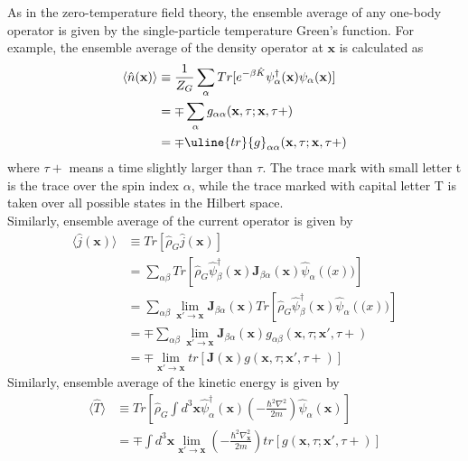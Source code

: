 As in the zero-temperature field theory, the ensemble average of any one-body operator is given by the single-particle temperature Green's function.
For example, the ensemble average of the density operator at $\mathbf{x}$ is calculated as
\begin{equation}\label{eq4.1.7}
\begin{aligned}
\langle\hat{n}(\mathbf{x})\rangle&\equiv\frac{1}{Z_{G}}\sum_{\alpha}Tr[e^{-\beta\hat{K}}\psi_{\alpha}^{\dagger}(\mathbf{x})\psi_{\alpha}(\mathbf{x})]\\
&=\mp\sum_{\alpha}g_{\alpha\alpha}(\mathbf{x},\tau;\mathbf{x},\tau+)\\
&=\mp\uline{tr}{g}_{\alpha\alpha}(\mathbf{x},\tau;\mathbf{x},\tau+)
\end{aligned}
\end{equation}
where $\tau+$ means a time slightly larger than $\tau$. The trace mark with small letter t is the trace over the spin index $\alpha$, while the trace marked with capital letter T is taken over all possible states in the Hilbert space.\\
Similarly, ensemble average of the current operator is given by
\begin{equation}
\begin{aligned}
\langle\hat{j}(\mathbf{x})\rangle& \equiv Tr[\hat{\rho}_{G}\hat{j}(\mathbf{x})]\\
&=\sum_{\alpha\beta}Tr[\hat{\rho}_{G}\hat{\psi}_{\beta}^{\dagger}(\mathbf{x})\mathbf{J}_{\beta\alpha}(\mathbf{x})\hat{\psi}_{\alpha}(\mathbf(x))]\\
&=\sum_{\alpha\beta}\lim_{\mathbf{x'}\rightarrow\mathbf{x}}\mathbf{J}_{\beta\alpha}(\mathbf{x})Tr[\hat{\rho}_{G}\hat{\psi}_{\beta}^{\dagger}(\mathbf{x})\hat{\psi}_{\alpha}(\mathbf(x))]\\
&=\mp\sum_{\alpha\beta}\lim_{\mathbf{x'}\rightarrow\mathbf{x}}\mathbf{J}_{\beta\alpha}(\mathbf{x}) {g}_{\alpha\beta}(\mathbf{x},\tau;\mathbf{x'},\tau+)\\
&=\mp\lim_{\mathbf{x'}\rightarrow\mathbf{x}}tr[\mathbf{J}(\mathbf{x}) {g}(\mathbf{x},\tau;\mathbf{x'},\tau+)]
\end{aligned}
\end{equation}
Similarly, ensemble average of the kinetic energy is given by
\begin{equation}
\begin{aligned}
\langle\hat{T}\rangle & \equiv Tr\left[\hat{\rho}_{G}\int d^{3}\mathbf{x} \hat{\psi}_{\alpha}^{\dagger}(\mathbf{x}) \left(-\frac{\hbar^{2}\nabla^{2}}{2m}\right) \hat{\psi}_{\alpha}(\mathbf{x})\right]\\
&=\mp\int d^{3}\mathbf{x} \lim_{\mathbf{x'}\rightarrow\mathbf{x}} \left(-\frac{\hbar^{2}\nabla^{2}_{\mathbf{x}}}{2m}\right) tr[ {g}(\mathbf{x},\tau;\mathbf{x'},\tau+)]
\end{aligned}
\end{equation}
